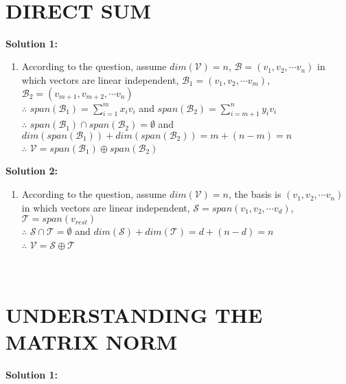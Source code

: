 \documentclass[english,onecolumn,UTF8]{IEEEtran}
\begin{document}
~\\

\section{DIRECT SUM}

\textbf{Solution 1:}
	\begin{enumerate}
	\item
		According to the question, assume $dim(\mathcal{V})=n$, $\mathcal{B}=(v_1, v_2,\cdots v_n)$ in which vectors are linear independent, $\mathcal{B}_1=(v_1, v_2,\cdots v_m)$, $\mathcal{B}_2=(v_{m+1}, v_{m+2},\cdots v_n)$\\
		$\therefore$ $span(\mathcal{B}_{1})=\sum _{i=1}^mx_iv_i$ and $span(\mathcal{B}_{2})=\sum _{i=m+1}^ny_iv_i$\\
		$\therefore$ $span(\mathcal{B}_{1}) \cap span(\mathcal{B}_{2})= \emptyset$ and $dim(span(\mathcal{B}_{1}))+dim(span(\mathcal{B}_{2}))=m+(n-m)=n$\\
		$\therefore$ $\mathcal{V}=span(\mathcal{B}_{1}) \oplus span(\mathcal{B}_{2})$
	\end{enumerate}

\textbf{Solution 2:}
	\begin{enumerate}
	\item
		According to the question, assume $dim(\mathcal{V})=n$, the basis is $(v_1, v_2,\cdots v_n)$ in which vectors are linear independent, $\mathcal{S}=span(v_1, v_2,\cdots v_d)$, $\mathcal{T}=span(v_{rest})$\\
		$\therefore$ $\mathcal{S}\cap \mathcal{T}= \emptyset$ and $dim(\mathcal{S})+dim(\mathcal{T})=d+(n-d)=n$\\
		$\therefore$ $\mathcal{V}=\mathcal{S} \oplus \mathcal{T}$
	\end{enumerate}
~\\
\section{UNDERSTANDING THE MATRIX NORM}

\textbf{Solution 1:}
\end{document}
